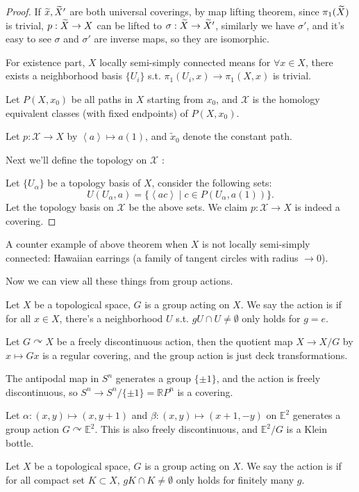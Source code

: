 \begin{proof}[Proof]
    If $\widetilde{x}, \widetilde{X}'$ are both universal coverings,
	by map lifting theorem, since $\pi_1(\widetilde{X})$ is trivial,
	$p: \widetilde{X} \to X$ can be lifted to $\sigma: \widetilde{X}\to \widetilde{X}'$,
	similarly we have $\sigma'$, and it's easy to see $\sigma$ and
	$\sigma'$ are inverse maps, so they are isomorphic.

	For existence part, $X$ locally semi-simply connected means
	for $\forall x\in X$, there exists a neighborhood basis $\{U_i\}$ s.t.
	$\pi_1(U_i, x) \to \pi_1(X, x)$ is trivial.

	Let $P(X, x_0)$ be all paths in $X$ starting from $x_0$,
	and $\mathscr{X}$ is the homology equivalent classes
	(with fixed endpoints) of $P(X, x_0)$.

	Let $p: \mathscr{X}\to X$ by $\left<a \right>\mapsto a(1)$,
	and $\tilde x_0$ denote the constant path.

	Next we'll define the topology on $\mathscr{X}$ :

	Let $\{U_\alpha\}$ be a topology basis of $X$,
	consider the following sets:
	\[
	U(U_\alpha, a) = \{\left<ac \right>\mid c\in P(U_\alpha, a(1))\}.
	\]
	Let the topology basis on $\mathscr{X}$ be the above sets.
	We claim $p: \mathscr{X}\to X$ is indeed a covering.
\end{proof}

\begin{example}
    A counter example of above theorem when $X$ is not locally
	semi-simply connected:
	Hawaiian earrings (a family of tangent circles with radius $\to 0$).
\end{example}

Now we can view all these things from group actions.

Let $X$ be a topological space, $G$ is a group acting on $X$.
We say the action is  if
for all $x\in X$, there's a neighborhood $U$ s.t. $gU \cap U \ne \emptyset$ only
holds for $g = e$.

\begin{proposition}
	Let $G\curvearrowright X$ be a freely discontinuous action,
	then the quotient map $X \to X / G$ by $x\mapsto Gx$ is
	a regular covering, and the group action is just deck transformations.
\end{proposition}

\begin{example}
    The antipodal map in $S^n$ generates a group $\{\pm 1\}$,
	and the action is freely discontinuous,
	so $S^n \to S^n / \{\pm 1\} = \mathbb{R}P^n$ is a covering.

	Let $\alpha: (x, y)\mapsto (x, y+1)$ and $\beta: (x, y)\mapsto (x+1, -y)$ on
	$\mathbb{E}^2$ generates a group action $G \curvearrowright \mathbb{E}^2$.
	This is also freely discontinuous, and $\mathbb{E}^2 / G$ is a Klein bottle.
\end{example}

Let $X$ be a topological space, $G$ is a group acting on $X$.
We say the action is  if
for all compact set $K \subset X$, $gK \cap K \ne \emptyset$ only
holds for finitely many $g$.
